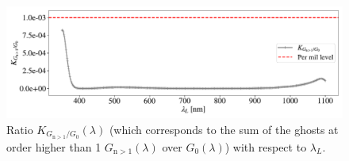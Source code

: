 \begin{figure}[h]
    \centering
    \includegraphics[width=\columnwidth]{fig/ratio_g1_ginf.pdf}
    \caption{Ratio $K_{G_{\mathrm{n}>1}/G_0}(\lambda)$ (which corresponds to the sum of the ghosts at order higher than 1 $G_{\mathrm{n}>1}(\lambda)$ over $G_0(\lambda)$) with respect to $\lambda_L$.}
    \label{fig:ratio_ginf_g0}
\end{figure}


